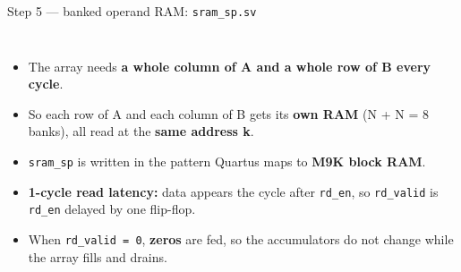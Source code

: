 \documentclass[aspectratio=169,11pt]{beamer}
\newcommand{\file}[1]{\texttt{\textcolor{copper}{#1}}}
\newcommand{\sig}[1]{\texttt{#1}}
\begin{document}
\begin{frame}{Step 5 --- banked operand RAM: \file{sram\_sp.sv}}
  \begin{columns}[T]
    \small
    \begin{itemize}
      \item The array needs \textbf{a whole column of A and a whole row of B every cycle}.
      \item So each row of A and each column of B gets its \textbf{own RAM} (N + N = 8 banks),
            all read at the \textbf{same address k}.
      \item \sig{sram\_sp} is written in the pattern Quartus maps to \textbf{M9K block RAM}.
      \item \textbf{1-cycle read latency:} data appears the cycle after \sig{rd\_en}, so
            \sig{rd\_valid} is \sig{rd\_en} delayed by one flip-flop.
      \item When \sig{rd\_valid = 0}, \textbf{zeros} are fed, so the accumulators do not change
            while the array fills and drains.
    \end{itemize}
  \end{columns}
\end{frame}
\end{document}

